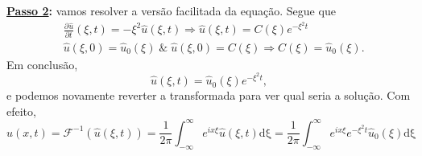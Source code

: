 \documentclass[../pde_notes.tex]{subfiles}
\begin{document}
\textbf{\underline{Passo 2}:} vamos resolver a versão facilitada da equação. Segue que
\begin{align*}
	 & \frac{\partial^{}\hat{u}}{\partial t^{}}(\xi , t) = -\xi^{2}\hat{u}(\xi , t) \Rightarrow \hat{u}(\xi , t) = C(\xi )e^{-\xi^{2}t} \\
	 & \hat{u}(\xi , 0) = \hat{u}_{0}(\xi )\;\&\; \hat{u}(\xi , 0) = C(\xi ) \Rightarrow C(\xi ) = \hat{u}_{0}(\xi ).
\end{align*}
Em conclusão,
\[
	\hat{u}(\xi , t)=\hat{u}_{0}(\xi )e^{-\xi^{2}t},
\]
e podemos novamente reverter a transformada para ver qual seria a solução. Com efeito,
\[
	u(x, t) = \mathcal{F}^{-1}(\hat{u}(\xi , t)) = \frac{1}{2\pi }\int_{-\infty}^{\infty}e^{ix\xi }\hat{u}(\xi , t) \mathrm{d\xi } = \frac{1}{2\pi }\int_{-\infty}^{\infty}e^{ix\xi }e^{-\xi^{2}t}\hat{u}_{0}(\xi) \mathrm{d\xi}
\]
\end{document}
